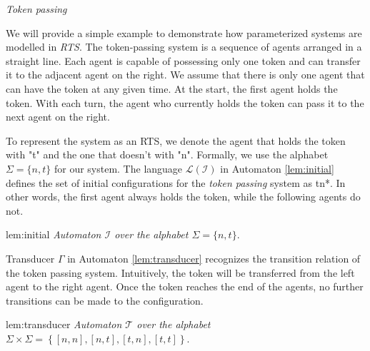 \begin{example}
    \textit{Token passing}
\end{example}
We will provide a simple example to demonstrate how parameterized systems are 
modelled in \textit{RTS}.
The token-passing system is a sequence of agents arranged in a straight line. 
Each agent is capable of possessing only one token and can transfer it to the adjacent agent on the right. 
We assume that there is only one agent that can have the token at any given time. 
At the start, the first agent holds the token. 
With each turn, the agent who currently holds the token can pass it to the next agent on the right.

To represent the system as an RTS, we denote the agent that holds the token with "t" and the one that doesn't with "n". 
Formally, we use the alphabet $\Sigma = \{n, t\}$ for our system.
The language $\mathcal{L}(\mathcal{I})$ in Automaton \ref{lem:initial} defines the set of initial configurations for the \textit{token passing} system
as tn*.
In other words, the first agent always holds the token, while the following agents do not.

\begin{lem}{lem:initial}
    \textit{Automaton $\mathcal{I}$ over the alphabet $\Sigma = \{n,t\}$}.\\
\end{lem}

Transducer $\Gamma$ in Automaton \ref{lem:transducer} recognizes the transition relation of the token passing system.
Intuitively, the token will be transferred from the left agent to the right agent. 
Once the token reaches the end of the agents, no further transitions can be made to the configuration.
\begin{lem}{lem:transducer}
    \textit{Automaton $\mathcal{T}$ over the alphabet $\Sigma \times \Sigma = \left\{[ n,n ], [ n,t ], [ t,n ], [ t,t ]\right\}$}. \\
\end{lem}

